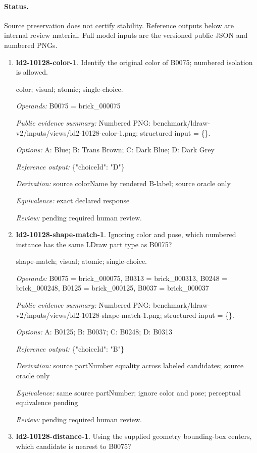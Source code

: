 \paragraph{Status.}Source preservation does not certify stability. Reference outputs below are internal review material. Full model inputs are the versioned public JSON and numbered PNGs.
\begin{enumerate}
\item \textbf{ld2-10128-color-1}. Identify the original color of B0075; numbered isolation is allowed.
\par{\small color; visual; atomic; single-choice.\par\textit{Operands:} B0075 = brick\_000075\par\textit{Public evidence summary:} Numbered PNG: benchmark/ldraw-v2/inputs/views/ld2-10128-color-1.png; structured input = \{\}.\par\textit{Options:} A: Blue; B: Trans Brown; C: Dark Blue; D: Dark Grey\par\textit{Reference output:} \{"choiceId": "D"\}\par\textit{Derivation:} source colorName by rendered B-label; source oracle only\par\textit{Equivalence:} exact declared response\par\textit{Review:} pending required human review.}
\item \textbf{ld2-10128-shape-match-1}. Ignoring color and pose, which numbered instance has the same LDraw part type as B0075?
\par{\small shape-match; visual; atomic; single-choice.\par\textit{Operands:} B0075 = brick\_000075, B0313 = brick\_000313, B0248 = brick\_000248, B0125 = brick\_000125, B0037 = brick\_000037\par\textit{Public evidence summary:} Numbered PNG: benchmark/ldraw-v2/inputs/views/ld2-10128-shape-match-1.png; structured input = \{\}.\par\textit{Options:} A: B0125; B: B0037; C: B0248; D: B0313\par\textit{Reference output:} \{"choiceId": "B"\}\par\textit{Derivation:} source partNumber equality across labeled candidates; source oracle only\par\textit{Equivalence:} same source partNumber; ignore color and pose; perceptual equivalence pending\par\textit{Review:} pending required human review.}
\item \textbf{ld2-10128-distance-1}. Using the supplied geometry bounding-box centers, which candidate is nearest to B0075?

\end{enumerate}
